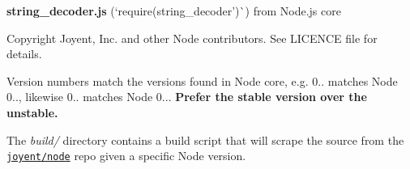 {\bfseries string\+\_\+decoder.\+js} (`require(\textquotesingle{}string\+\_\+decoder')\`{}) from Node.\+js core

Copyright Joyent, Inc. and other Node contributors. See L\+I\+C\+E\+N\+CE file for details.

Version numbers match the versions found in Node core, e.\+g. 0.. matches Node 0.., likewise 0.. matches Node 0... {\bfseries Prefer the stable version over the unstable.}

The {\itshape build/} directory contains a build script that will scrape the source from the \href{https://github.com/joyent/node}{\tt joyent/node} repo given a specific Node version. 